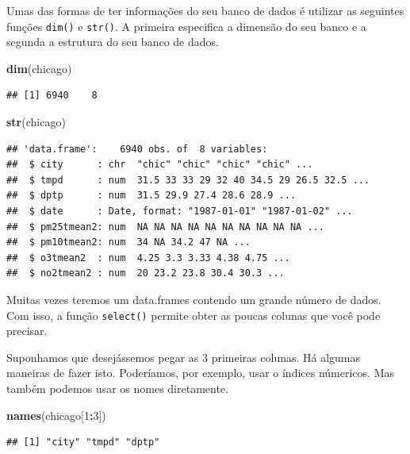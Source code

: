 \documentclass[]{book}
\newenvironment{Shaded}{\begin{snugshade}}{\end{snugshade}}
\newcommand{\DecValTok}[1]{\textcolor[rgb]{0.00,0.00,0.81}{#1}}
\newcommand{\KeywordTok}[1]{\textcolor[rgb]{0.13,0.29,0.53}{\textbf{#1}}}
\newcommand{\NormalTok}[1]{#1}
\newcommand{\OperatorTok}[1]{\textcolor[rgb]{0.81,0.36,0.00}{\textbf{#1}}}
\begin{document}
Umas das formas de ter informações do seu banco de dados é utilizar as seguintes funções \texttt{dim()} e \texttt{str()}. A primeira especifica a dimensão do seu banco e a segunda a estrutura do seu banco de dados.

\begin{Shaded}
\begin{Highlighting}[]
\KeywordTok{dim}\NormalTok{(chicago)}
\end{Highlighting}
\end{Shaded}

\begin{verbatim}
## [1] 6940    8
\end{verbatim}

\begin{Shaded}
\begin{Highlighting}[]
\KeywordTok{str}\NormalTok{(chicago)}
\end{Highlighting}
\end{Shaded}

\begin{verbatim}
## 'data.frame':    6940 obs. of  8 variables:
##  $ city      : chr  "chic" "chic" "chic" "chic" ...
##  $ tmpd      : num  31.5 33 33 29 32 40 34.5 29 26.5 32.5 ...
##  $ dptp      : num  31.5 29.9 27.4 28.6 28.9 ...
##  $ date      : Date, format: "1987-01-01" "1987-01-02" ...
##  $ pm25tmean2: num  NA NA NA NA NA NA NA NA NA NA ...
##  $ pm10tmean2: num  34 NA 34.2 47 NA ...
##  $ o3tmean2  : num  4.25 3.3 3.33 4.38 4.75 ...
##  $ no2tmean2 : num  20 23.2 23.8 30.4 30.3 ...
\end{verbatim}

Muitas vezes teremos um data.frames contendo um grande número de dados. Com isso, a função \texttt{select()} permite obter as poucas colunas que você pode precisar.

Suponhamos que desejássemos pegar as 3 primeiras colunas. Há algumas maneiras de fazer isto. Poderíamos, por exemplo, usar o índices númericos. Mas também podemos usar os nomes diretamente.

\begin{Shaded}
\begin{Highlighting}[]
\KeywordTok{names}\NormalTok{(chicago[}\DecValTok{1}\OperatorTok{:}\DecValTok{3}\NormalTok{]) }
\end{Highlighting}
\end{Shaded}

\begin{verbatim}
## [1] "city" "tmpd" "dptp"
\end{verbatim}
\end{document}
